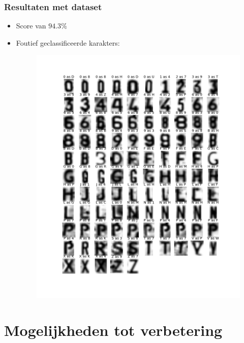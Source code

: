 \documentclass{beamer}
\begin{document}
    \begin{frame}
        \frametitle{Resultaten met dataset}

        \begin{itemize}
            \item Score van $94.3\%$
            \item Foutief geclassificeerde karakters:
            \begin{figure}
                \includegraphics[scale=.2]{faulty.png}
            \end{figure}
        \end{itemize}
    \end{frame}

    \section{Mogelijkheden tot verbetering}
\end{document}
